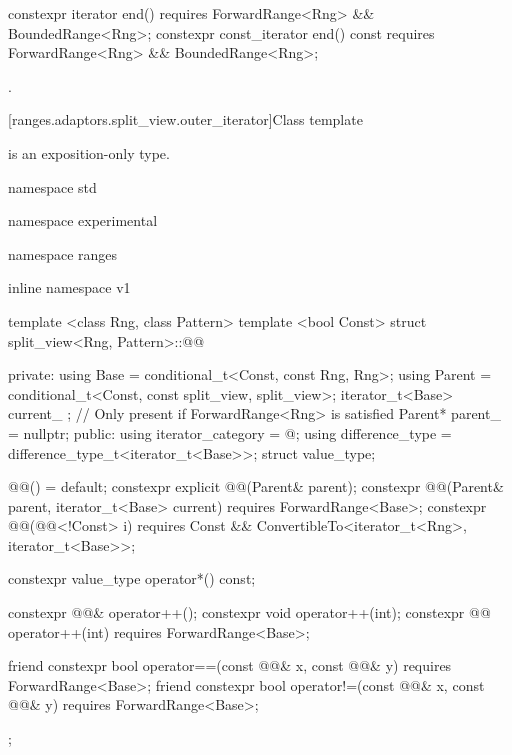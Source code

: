 %
\begin{itemdecl}
constexpr iterator end()
requires ForwardRange<Rng> && BoundedRange<Rng>;
constexpr const_iterator end() const
requires ForwardRange<Rng> && BoundedRange<Rng>;
\end{itemdecl}

\begin{itemdescr}
\pnum
\returns {}.
\end{itemdescr}

[ranges.adaptors.split_view.outer_iterator]{Class template }

\pnum
\enternote {} is an exposition-only type.\exitnote

\begin{codeblock}
namespace std { namespace experimental { namespace ranges { inline namespace v1 {
  template <class Rng, class Pattern>
  template <bool Const>
  struct split_view<Rng, Pattern>::@@ {
  private:
    using Base = conditional_t<Const, const Rng, Rng>;
    using Parent = conditional_t<Const, const split_view, split_view>;
    iterator_t<Base> current_ {}; // Only present if ForwardRange<Rng> is satisfied
    Parent* parent_ = nullptr;
  public:
    using iterator_category = @\seebelow@;
    using difference_type = difference_type_t<iterator_t<Base>>;
    struct value_type;

    @@() = default;
    constexpr explicit @@(Parent& parent);
    constexpr @@(Parent& parent, iterator_t<Base> current)
      requires ForwardRange<Base>;
    constexpr @@(@@<!Const> i) requires Const &&
      ConvertibleTo<iterator_t<Rng>, iterator_t<Base>>;

    constexpr value_type operator*() const;

    constexpr @@& operator++();
    constexpr void operator++(int);
    constexpr @@ operator++(int) requires ForwardRange<Base>;

    friend constexpr bool operator==(const @@& x, const @@& y)
      requires ForwardRange<Base>;
    friend constexpr bool operator!=(const @@& x, const @@& y)
      requires ForwardRange<Base>;
  };
}}}}
\end{codeblock}

